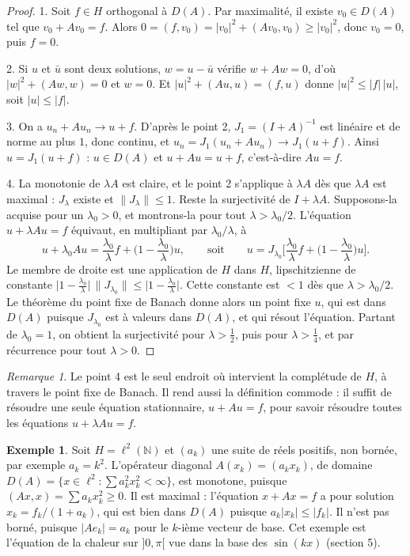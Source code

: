 \documentclass[11pt,a4paper]{article}
\theoremstyle{plain}
\theoremstyle{definition}
\newtheorem{exemple}[theoreme]{Exemple}
\theoremstyle{remark}
\newtheorem{remarque}[theoreme]{Remarque}
\newcommand{\N}{\mathbb{N}}
\begin{document}
\begin{proof}
1. Soit $f\in H$ orthogonal à $D(A)$. Par maximalité, il existe $v_0\in D(A)$ tel que $v_0+Av_0=f$. Alors $0=(f,v_0)=|v_0|^2+(Av_0,v_0)\geq|v_0|^2$, donc $v_0=0$, puis $f=0$.

2. Si $u$ et $\bar u$ sont deux solutions, $w=u-\bar u$ vérifie $w+Aw=0$, d'où $|w|^2+(Aw,w)=0$ et $w=0$. Et $|u|^2+(Au,u)=(f,u)$ donne $|u|^2\leq|f|\,|u|$, soit $|u|\leq|f|$.

3. On a $u_n+Au_n\to u+f$. D'après le point 2, $J_1=(I+A)^{-1}$ est linéaire et de norme au plus $1$, donc continu, et $u_n=J_1(u_n+Au_n)\to J_1(u+f)$. Ainsi $u=J_1(u+f)$ : $u\in D(A)$ et $u+Au=u+f$, c'est-à-dire $Au=f$.

4. La monotonie de $\lambda A$ est claire, et le point 2 s'applique à $\lambda A$ dès que $\lambda A$ est maximal : $J_\lambda$ existe et $\|J_\lambda\|\leq1$. Reste la surjectivité de $I+\lambda A$. Supposons-la acquise pour un $\lambda_0>0$, et montrons-la pour tout $\lambda>\lambda_0/2$. L'équation $u+\lambda Au=f$ équivaut, en multipliant par $\lambda_0/\lambda$, à
\[
  u+\lambda_0Au=\frac{\lambda_0}\lambda f+\Big(1-\frac{\lambda_0}\lambda\Big)u,
  \qquad\text{soit}\qquad
  u=J_{\lambda_0}\Big[\frac{\lambda_0}\lambda f+\Big(1-\frac{\lambda_0}\lambda\Big)u\Big].
\]
Le membre de droite est une application de $H$ dans $H$, lipschitzienne de constante $\big|1-\frac{\lambda_0}\lambda\big|\,\|J_{\lambda_0}\|\leq\big|1-\frac{\lambda_0}\lambda\big|$. Cette constante est $<1$ dès que $\lambda>\lambda_0/2$. Le théorème du point fixe de Banach donne alors un point fixe $u$, qui est dans $D(A)$ puisque $J_{\lambda_0}$ est à valeurs dans $D(A)$, et qui résout l'équation. Partant de $\lambda_0=1$, on obtient la surjectivité pour $\lambda>\frac12$, puis pour $\lambda>\frac14$, et par récurrence pour tout $\lambda>0$.
\end{proof}

\begin{remarque}
Le point 4 est le seul endroit où intervient la complétude de $H$, à travers le point fixe de Banach. Il rend aussi la définition commode : il suffit de résoudre une seule équation stationnaire, $u+Au=f$, pour savoir résoudre toutes les équations $u+\lambda Au=f$.
\end{remarque}

\begin{exemple}\label{ex:diag}
Soit $H=\ell^2(\N)$ et $(a_k)$ une suite de réels positifs, non bornée, par exemple $a_k=k^2$. L'opérateur diagonal $A(x_k)=(a_kx_k)$, de domaine $D(A)=\{x\in\ell^2 : \sum a_k^2x_k^2<\infty\}$, est monotone, puisque $(Ax,x)=\sum a_kx_k^2\geq0$. Il est maximal : l'équation $x+Ax=f$ a pour solution $x_k=f_k/(1+a_k)$, qui est bien dans $D(A)$ puisque $a_k|x_k|\leq|f_k|$. Il n'est pas borné, puisque $|Ae_k|=a_k$ pour le $k$-ième vecteur de base. Cet exemple est l'équation de la chaleur sur $]0,\pi[$ vue dans la base des $\sin(kx)$ (section 5).
\end{exemple}
\end{document}

